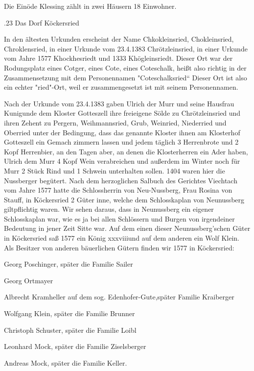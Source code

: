 Die Einöde Klessing zählt in zwei Häusern 18 Einwohner.

.23 Das Dorf Köckersried

In den ältesten Urkunden erscheint der Name Chkokleinsried, Chokleinsried,
Chroklensried, in einer Urkunde vom 23.4.1383 Chrötzleinsried, in einer Urkunde
vom Jahre 1577 Khockhesriedt und 1333 Khögleinsriedt. Dieser Ort war der
Rodungsplatz eines Cotger, eines Cote, eines Coteschalk, heißt also richtig in
der Zusammensetzung mit dem Personennamen "Coteschalksried“ Dieser Ort ist also
ein echter "ried"-Ort, weil er zusammengesetzt ist mit seinem Personennamen.

Nach der Urkunde vom 23.4.1383 gaben Ulrich der Murr und seine Hausfrau
Kunigunde dem Kloster Gotteszell ihre freieigene Sölde zu Chrötzleinsried und
ihren Zehent zu Pergern, Weihmannsried, Grub, Weinried, Niederried und Oberried
unter der Bedingung, dass das genannte Kloster ihnen am Klosterhof Gotteszell
ein Gemach zimmern lassen und jedem täglich 3 Herrenbrote und 2 Kopf Herrenbier,
an den Tagen aber, an denen die Klosterherren ein Ader haben, Ulrich dem Murr 4
Kopf Wein verabreichen und außerdem im Winter noch für Murr 2 Stück Rind und 1
Schwein unterhalten sollen. 1404 waren hier die Nussberger begütert. Nach dem
herzoglichen Salbuch des Gerichtes Viechtach vom Jahre 1577 hatte die
Schlossherrin von Neu-Nussberg, Frau Rosina von Stauff, in Köckersried 2 Güter
inne, welche dem Schlosskaplan von Neunussberg giltpflichtig waren. Wir sehen
daraus, dass in Neunussberg ein eigener Schlosskaplan war, wie es ja bei allen
Schlössern und Burgen von irgendeiner Bedeutung in jener Zeit Sitte war. Auf dem
einen dieser Neunussberg'schen Güter in Köckersried saß 1577 ein König
xxxviiiund auf dem anderen ein Wolf Klein. Als Besitzer von anderen bäuerlichen
Gütern finden wir 1577 in Köckersried:



Georg Poschinger, später die Familie Sailer

Georg Ortmayer

Albrecht Kramheller auf dem sog. Edenhofer-Gute,später Familie Kraiberger

Wolfgang Klein, später die Familie Brunner

Christoph Schuster, später die Familie Loibl

Leonhard Mock, später die Familie Ziselsberger

Andreas Mock, später die Familie Keller.



